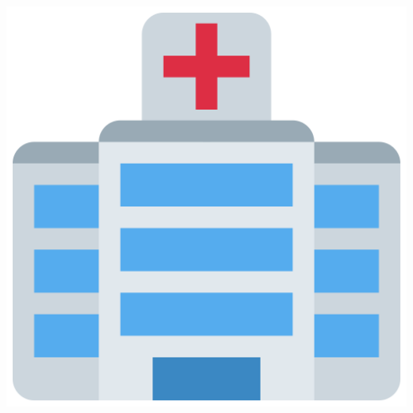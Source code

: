 \begin{frame}
    \hspace{2cm}
    \includegraphics[scale=0.1]{Bin/cartoon_pics/hospital.png}


\end{frame}

